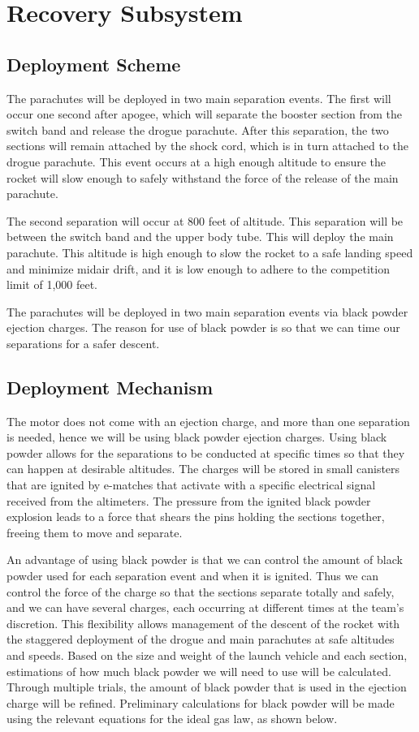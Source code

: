 
\section{Recovery Subsystem}

    \subsection{Deployment Scheme}
The parachutes will be deployed in two main separation events. The first will occur one second after apogee, which will separate the booster section from the switch band and release the drogue parachute. After this separation, the two sections will remain attached by the shock cord, which is in turn attached to the drogue parachute. This event occurs at a high enough altitude to ensure the rocket will slow enough to safely withstand the force of the release of the main parachute.

The second separation will occur at 800 feet of altitude. This separation will be between the switch band and the upper body tube. This will deploy the main parachute. This altitude is high enough to slow the rocket to a safe landing speed and minimize midair drift, and it is low enough to adhere to the competition limit of 1,000 feet.
 
The parachutes will be deployed in two main separation events via black powder ejection charges. The reason for use of black powder is so that we can time our separations for a safer descent. 


    \subsection{Deployment Mechanism}
The motor does not come with an ejection charge, and more than one separation is needed, hence we will be using black powder ejection charges. Using black powder allows for the separations to be conducted at specific times so that they can happen at desirable altitudes. The charges will be stored in small canisters that are ignited by e-matches that activate with a specific electrical signal received from the altimeters. The pressure from the ignited black powder explosion leads to a force that shears the pins holding the sections together, freeing them to move and separate. 

An advantage of using black powder is that we can control the amount of black powder used for each separation event and when it is ignited. Thus we can control the force of the charge so that the sections separate totally and safely, and we can have several charges, each occurring at different times at the team’s discretion. This flexibility allows management of the descent of the rocket with the staggered deployment of the drogue and main parachutes at safe altitudes and speeds. Based on the size and weight of the launch vehicle and each section, estimations of how much black powder we will need to use will be calculated. Through multiple trials, the amount of black powder that is used in the ejection charge will be refined. Preliminary calculations for black powder will be made using the relevant equations for the ideal gas law, as shown below.

